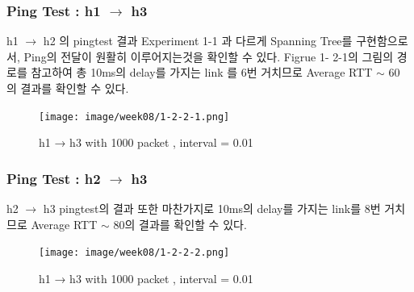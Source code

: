 \subsubsection*{Ping Test : h1 $\to$ h3}
\quad h1 $\to$ h2 의 pingtest 결과 Experiment 1-1 과 다르게 Spanning Tree를 구현함으로서, Ping의 전달이 원활히 이루어지는것을 확인할 수 있다. Figrue 1- 2-1의 그림의 경로를 참고하여 총 10ms의  delay를 가지는  link 를 6번 거치므로 Average RTT $\sim$ 60 의 결과를 확인할 수 있다. \\
\vspace{-4mm}
\begin{figure}[!h]\centering 
	\texttt{[image: image/week08/1-2-2-1.png]}
	\caption{\footnotesize
	h1 → h3 with 1000 packet , interval = 0.01   }
	\vspace{-10pt}
\end{figure}
    \vspace{-4mm}
\subsubsection*{Ping Test : h2 $\to$ h3} 
\quad h2 $\to$ h3 pingtest의 결과 또한 마찬가지로 10ms의 delay를 가지는 link를 8번 거치므로 Average RTT $\sim$ 80의 결과를 확인할 수 있다.\\
\vspace{-4mm}
\begin{figure}[!h]\centering 
	\texttt{[image: image/week08/1-2-2-2.png]}
	\caption{\footnotesize
	h1 → h3 with 1000 packet , interval = 0.01  }
	\vspace{-10pt}
\end{figure}
\clearpage
